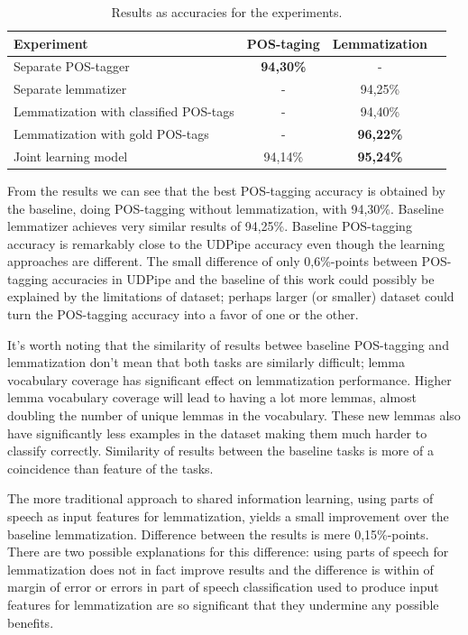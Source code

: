 \documentclass[12pt,a4paper,english
]{tutthesis}
\begin{document}
\begin{table}[htbp]
\caption{Results as accuracies for the experiments.}
\label{table:results}
\centering
\begin{tabular}{|l|c|c|l|}
  \hline
  Experiment & POS-taging & Lemmatization \\
  \hline
  \hline
  Separate POS-tagger & \textbf{94,30\%} & - \\
  Separate lemmatizer & - & 94,25\% \\
  Lemmatization with classified POS-tags & - & 94,40\% \\
  Lemmatization with gold POS-tags & - & \textbf{96,22\%} \\
  Joint learning model & 94,14\% & \textbf{95,24\%} \\
  \hline
\end{tabular}
\end{table}

From the results we can see that the best POS-tagging accuracy is obtained by the baseline, doing POS-tagging without lemmatization, with 94,30\%. Baseline lemmatizer achieves very similar results of 94,25\%. Baseline POS-tagging accuracy is remarkably close to the UDPipe accuracy even though the learning approaches are different. The small difference of only 0,6\%-points between POS-tagging accuracies in UDPipe and the baseline of this work could possibly be explained by the limitations of dataset; perhaps larger (or smaller) dataset could turn the POS-tagging accuracy into a favor of one or the other.

It's worth noting that the similarity of results betwee baseline POS-tagging and lemmatization don't mean that both tasks are similarly difficult; lemma vocabulary coverage has significant effect on lemmatization performance. Higher lemma vocabulary coverage will lead to having a lot more lemmas, almost doubling the number of unique lemmas in the vocabulary. These new lemmas also have significantly less examples in the dataset making them much harder to classify correctly. Similarity of results between the baseline tasks is more of a coincidence than feature of the tasks.

The more traditional approach to shared information learning, using parts of speech as input features for lemmatization, yields a small improvement over the baseline lemmatization. Difference between the results is mere 0,15\%-points. There are two possible explanations for this difference: using parts of speech for lemmatization does not in fact improve results and the difference is within of margin of error or errors in part of speech classification used to produce input features for lemmatization are so significant that they undermine any possible benefits.
\end{document}
